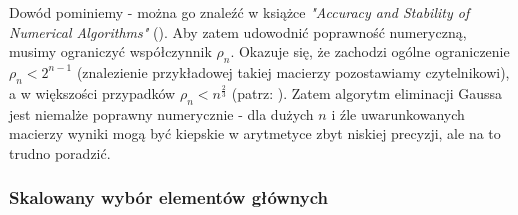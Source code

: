 \documentclass{article}
\begin{document}
Dowód pominiemy - można go znaleźć w książce \textit{"Accuracy and Stability of Numerical Algorithms"} (\cite{higham2002accuracy}). Aby zatem udowodnić poprawność numeryczną, musimy ograniczyć współczynnik $\rho_n$. Okazuje się, że zachodzi ogólne ograniczenie $\rho_n < 2^{n-1}$ (znalezienie przykładowej takiej macierzy pozostawiamy czytelnikowi), a w większości przypadków $\rho_n < n^{\frac{2}{3}}$ (patrz: \cite{higham2002accuracy}). Zatem algorytm eliminacji Gaussa jest niemalże poprawny numerycznie - dla dużych $n$ i źle uwarunkowanych macierzy wyniki mogą być kiepskie w arytmetyce zbyt niskiej precyzji, ale na to trudno poradzić.

\subsubsection{Skalowany wybór elementów głównych}
\end{document}
